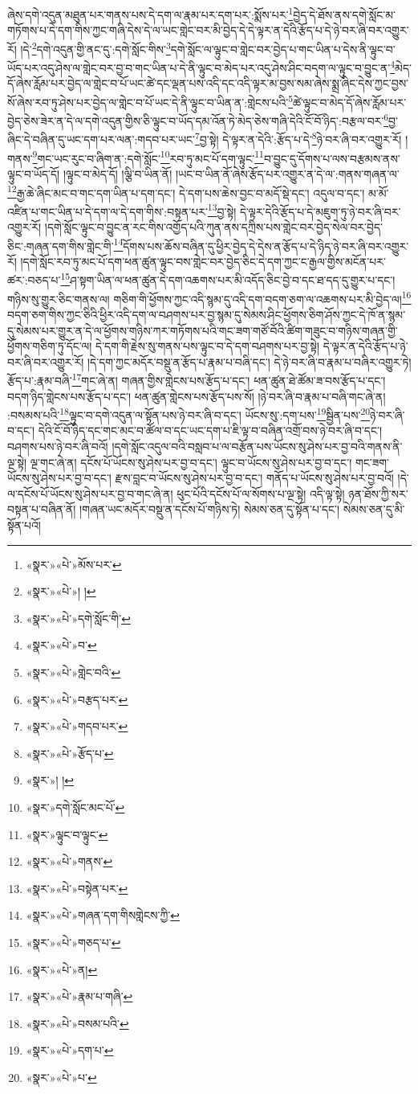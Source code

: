 ཞེས་དགེ་འདུན་མཐུན་པར་གནས་པས་དེ་དག་ལ་རྣམ་པར་དག་པར་:སྨོས་པར་\footnote{«སྣར་»«པེ་»མོས་པར་}བྱེད་དེ་ཐོས་ནས་དགེ་སློང་མ་གཏོགས་པ་དེ་དག་གིས་ཀྱང་གཞི་དེས་དེ་ལ་ཡང་གླེང་བར་མི་བྱེད་དེ་དེ་ལྟར་ན་དེའི་རྩོད་པ་དེ་ཉེ་བར་ཞི་བར་འགྱུར་རོ། །དེ་\footnote{«སྣར་»«པེ་»། །}དགེ་འདུན་གྱི་ནང་དུ་:དགེ་སློང་གིས་\footnote{«སྣར་»«པེ་»དགེ་སློང་གི་}དགེ་སློང་ལ་ལྟུང་བ་གླེང་བར་བྱེད་པ་གང་ཡིན་པ་དེས་ནི་ལྟུང་བ་ཡོད་པར་འདུ་ཤེས་ལ་གླེང་བར་བྱ་བ་གང་ཡིན་པ་དེ་ནི་ལྟུང་བ་མེད་པར་འདུ་ཤེས་ཤིང་བདག་ལ་ལྟུང་བ་བྱུང་ན་\footnote{«སྣར་»«པེ་»བ་}མེད་དོ་ཞེས་རློམ་པར་བྱེད་ལ་གླེང་བ་པོ་ཡང་ཚེ་དང་ལྡན་པས་འདི་དང་འདི་ལྟར་མ་བྱས་སམ་ཞེས་སྨྲ་ཞིང་དེས་ཀྱང་བྱས་སོ་ཞེས་རབ་ཏུ་ཤེས་པར་བྱེད་ལ་གླེང་བ་པོ་ཡང་དེ་ནི་ལྟུང་བ་ཡིན་ན་:གླེངས་པའི་\footnote{«སྣར་»«པེ་»གླེང་བའི་}ཚེ་ལྟུང་བ་མེད་དོ་ཞེས་རློམ་པར་བྱེད་ཅེས་ཟེར་ན་དེ་ལ་དགེ་འདུན་གྱིས་ཅི་ལྟུང་བ་ཡོད་དམ་འོན་ཏེ་མེད་ཅེས་གཞི་དེའི་ངོ་བོ་ཉིད་:བརྩལ་བར་\footnote{«སྣར་»«པེ་»བརྩད་པར་}བྱ་ཞིང་དེ་བཞིན་དུ་ཡང་དག་པར་ལན་:གདབ་པར་ཡང་\footnote{«སྣར་»«པེ་»གདབ་པར་}བྱ་སྟེ། དེ་ལྟར་ན་དེའི་:རྩོད་པ་དེ་\footnote{«སྣར་»«པེ་»རྩོད་པ་}ཉེ་བར་ཞི་བར་འགྱུར་རོ། །གནས་\footnote{«སྣར་»། །}གང་ཡང་རུང་བ་ཞིག་ན་:དགེ་སློང་\footnote{«སྣར་»དགེ་སློང་མང་པོ་}རབ་ཏུ་མང་པོ་དག་ལྟུང་\footnote{«སྣར་»ལྟུང་བ་ལྟུང་}བ་བྱུང་དུ་དོགས་པ་ལས་བརྩམས་ནས་ལྟུང་བ་ཡོད་དོ། །ལྟུང་བ་མེད་དོ། །ལྕི་བ་ཡིན་ནོ། །ཡང་བ་ཡིན་ནོ་ཞེས་རྩོད་པར་འགྱུར་ན་དེ་ལ་:གནས་གཞན་ལ་\footnote{«སྣར་»«པེ་»གནས་}རྒྱ་ཆེ་ཞིང་མང་བ་གང་དག་ཡིན་པ་དག་དང་། དེ་དག་པས་ཆེས་བྱང་བ་མདོ་སྡེ་དང་། འདུལ་བ་དང་། མ་མོ་འཛིན་པ་གང་ཡིན་པ་དེ་དག་ལ་དེ་དག་གིས་:བསྟན་པར་\footnote{«སྣར་»«པེ་»བསྟེན་པར་}བྱ་སྟེ། དེ་ལྟར་དེའི་རྩོད་པ་དེ་མཇུག་ཏུ་ཉེ་བར་ཞི་བར་འགྱུར་རོ། །དགེ་སློང་ལྟུང་བ་བྱུང་ན་རང་གིས་འགྱོད་པའི་ཀུན་ནས་དཀྲིས་པས་གླེང་བར་བྱེད་སེལ་བར་བྱེད་ཅིང་:གཞན་དག་གིས་གླེང་གི་\footnote{«སྣར་»«པེ་»གཞན་དག་གིསགླེངས་ཀྱི་}དོགས་པས་ཆོས་བཞིན་དུ་ཕྱིར་བྱེད་དེ་དེས་ན་རྩོད་པ་དེ་ཉིད་ཉེ་བར་ཞི་བར་འགྱུར་རོ། །དགེ་སློང་རབ་ཏུ་མང་པོ་དག་ཕན་ཚུན་ལྟུང་བས་གླེང་བར་བྱེད་ཅིང་དེ་དག་ཀྱང་ང་རྒྱལ་གྱིས་མངོན་པར་ཚར་:བཅད་པ་\footnote{«སྣར་»«པེ་»གཅད་པ་}ཤ་སྟག་ཡིན་ལ་ཕན་ཚུན་དེ་དག་འཆགས་པར་མི་འདོད་ཅིང་བྱེ་བ་དང་ཐ་དད་དུ་གྱུར་པ་དང་། གཉིས་སུ་གྱུར་ཅིང་གནས་ལ། གཅིག་གི་ཕྱོགས་ཀྱང་འདི་སྙམ་དུ་འདི་དག་བདག་ཅག་ལ་འཆགས་པར་མི་བྱེད་ལ།\footnote{«སྣར་»«པེ་»ན།} བདག་ཅག་གིས་ཀྱང་ཅིའི་ཕྱིར་འདི་དག་ལ་བཤགས་པར་བྱ་སྙམ་དུ་སེམས་ཤིང་ཕྱོགས་ཅིག་ཤོས་ཀྱང་དེ་ཁོ་ན་སྙམ་དུ་སེམས་པར་གྱུར་ན་དེ་ལ་ཕྱོགས་གཉིས་ཀར་གཏོགས་པའི་གང་ཟག་གཙོ་བོའི་ཚིག་གཟུང་བ་གཉིས་གཞན་གྱི་ཕྱོགས་གཅིག་ཏུ་དོང་ལ། དེ་དག་གི་རྗེས་སུ་གནས་པས་ལྟུང་བ་དེ་དག་བཤགས་པར་བྱ་སྟེ། དེ་ལྟར་ན་དེའི་རྩོད་པ་ཉེ་བར་ཞི་བར་འགྱུར་རོ། །དེ་དག་ཀྱང་མདོར་བསྡུ་ན་རྩོད་པ་རྣམ་པ་བཞི་དང་། དེ་ཉེ་བར་ཞི་བ་རྣམ་པ་བཞིར་འགྱུར་ཏེ། རྩོད་པ་:རྣམ་བཞི་\footnote{«སྣར་»«པེ་»རྣམ་པ་གཞི་}གང་ཞེ་ན། གཞན་གྱིས་གླེངས་པས་རྩོད་པ་དང་། ཕན་ཚུན་ཐེ་ཚོམ་ཟ་བས་རྩོད་པ་དང་། བདག་ཉིད་གླེངས་པས་རྩོད་པ་དང་། ཕན་ཚུན་གླེངས་པས་རྩོད་པས་སོ། །ཉེ་བར་ཞི་བ་རྣམ་པ་བཞི་གང་ཞེ་ན། :བསམས་པའི་\footnote{«སྣར་»«པེ་»བསམ་པའི་}ལྟུང་བ་དགེ་འདུན་ལ་སྟོན་པས་ཉེ་བར་ཞི་བ་དང་། ཡོངས་སུ་:དག་པས་\footnote{«སྣར་»«པེ་»དག་པ་}སྦྱིན་པས་\footnote{«སྣར་»«པེ་»པ་}ཉེ་བར་ཞི་བ་དང་། དེའི་ངོ་བོ་ཉིད་དང་གང་མང་བ་ཚོལ་བ་དང་ཡང་དག་པ་ཇི་ལྟ་བ་བཞིན་འགྲོ་བས་ཉེ་བར་ཞི་བ་དང་། བཤགས་པས་ཉེ་བར་ཞི་བའོ། །དགེ་སློང་འདུལ་བའི་བསླབ་པ་ལ་བརྩོན་པས་ཡོངས་སུ་ཤེས་པར་བྱ་བའི་གནས་ནི་ལྔ་སྟེ། ལྔ་གང་ཞེ་ན། དངོས་པོ་ཡོངས་སུ་ཤེས་པར་བྱ་བ་དང་། ལྟུང་བ་ཡོངས་སུ་ཤེས་པར་བྱ་བ་དང་། གང་ཟག་ཡོངས་སུ་ཤེས་པར་བྱ་བ་དང་། རྫས་བླང་བ་ཡོངས་སུ་ཤེས་པར་བྱ་བ་དང་། གནོད་པ་ཡོངས་སུ་ཤེས་པར་བྱ་བའོ། །དེ་ལ་དངོས་པོ་ཡོངས་སུ་ཤེས་པར་བྱ་བ་གང་ཞེ་ན། ཕུང་པོའི་དངོས་པོ་ལ་སོགས་པ་ལྔ་སྟེ། འདི་ལྟ་སྟེ། ཉན་ཐོས་ཀྱི་སར་བསྟན་པ་བཞིན་ནོ། །གཞན་ཡང་མདོར་བསྡུ་ན་དངོས་པོ་གཉིས་ཏེ། སེམས་ཅན་དུ་སྟོན་པ་དང་། སེམས་ཅན་དུ་མི་སྟོན་པའོ། 